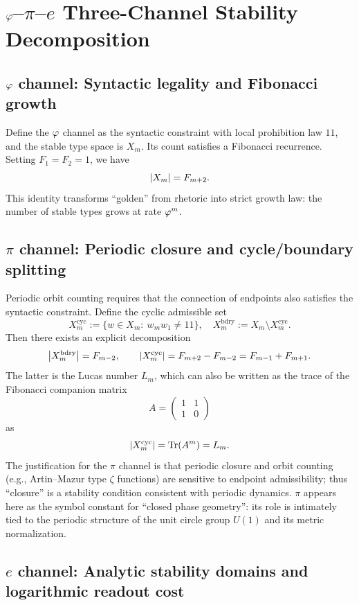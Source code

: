 \section{\texorpdfstring{$\varphi$--$\pi$--$e$}{phi-pi-e} Three-Channel Stability Decomposition}

\subsection{\texorpdfstring{$\varphi$}{phi} channel: Syntactic legality and Fibonacci growth}

Define the $\varphi$ channel as the syntactic constraint with local prohibition law $11$, and the stable type space is $X_m$. Its count satisfies a Fibonacci recurrence. Setting $F_1=F_2=1$, we have
\[
\left\lvert X_m\right\rvert=F_{m+2}.
\]
This identity transforms ``golden'' from rhetoric into strict growth law: the number of stable types grows at rate $\varphi^m$.

\subsection{\texorpdfstring{$\pi$}{pi} channel: Periodic closure and cycle/boundary splitting}

Periodic orbit counting requires that the connection of endpoints also satisfies the syntactic constraint. Define the cyclic admissible set
\[
X_m^{\mathrm{cyc}}:=\{w\in X_m:\ w_m w_1\neq 11\},
\quad
X_m^{\mathrm{bdry}}:=X_m\setminus X_m^{\mathrm{cyc}}.
\]
Then there exists an explicit decomposition
\[
\left\lvert X_m^{\mathrm{bdry}}\right\rvert=F_{m-2},\qquad
\left\lvert X_m^{\mathrm{cyc}}\right\rvert=F_{m+2}-F_{m-2}=F_{m-1}+F_{m+1}.
\]
The latter is the Lucas number $L_m$, which can also be written as the trace of the Fibonacci companion matrix
\[
A=\begin{pmatrix}1&1\\1&0\end{pmatrix}
\]
as
\[
\left\lvert X_m^{\mathrm{cyc}}\right\rvert=\mathrm{Tr}(A^m)=L_m.
\]
The justification for the $\pi$ channel is that periodic closure and orbit counting (e.g., Artin--Mazur type $\zeta$ functions) are sensitive to endpoint admissibility; thus ``closure'' is a stability condition consistent with periodic dynamics. $\pi$ appears here as the symbol constant for ``closed phase geometry'': its role is intimately tied to the periodic structure of the unit circle group $U(1)$ and its metric normalization.

\subsection{\texorpdfstring{$e$}{e} channel: Analytic stability domains and logarithmic readout cost}

